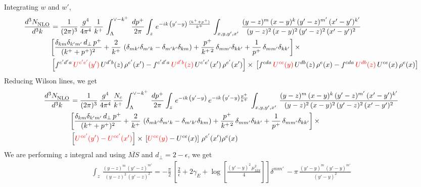 \documentclass[9pt]{article}
\numberwithin{equation}{section}
\begin{document}
Integrating $w$ and $w'$,
\begin{align}
     \frac{d^{3}N_{\rm NLO}^{\rm}}{d^{3}k}  & = \frac{1}{(2\pi)^{3}}\,\frac{g^{4}}{4\pi^{4}}\,\frac{1}{k^{+}}\,\int_{\Lambda}^{\vee-k^{+}}\, \frac{dp^{+}}{2\pi}\int_{z}\,e^{-ik\,\left(y'-y\right)\, \frac{(k^{+}+p^{+})}{k^{+}}}\,\int_{x,y,y^{\prime},x'}\,\frac{(y-z)^{m}\,(x-y)^{k}\,(y'-z)^{m'}\,(x'-y')^{k'}}{(y-z)^{2}\,(x-y)^{2}\,(y'-z)^{2}\,(x'-y')^{2}}\notag \\ &  \bigg[\frac{\delta_{km}\delta_{k'm'}\,d_{\perp}\,p^{+}}{(k^{+}+p^{+})^{2}}+\frac{2}{k^{+}}\,\left(\delta_{mk'}\delta_{m'k}-\delta_{m'k'}\delta_{km}\right) + \frac{p^{+}}{k^{+\,2}}\,\delta_{mm'}\delta_{kk'}+\frac{1}{p^{+}}\,\delta_{mm'}\delta_{kk'}\bigg]\,\times\,\notag \\ & \left[f^{c'd'a}\,{\color{red}U^{c'e'}(y')}\,U^{d'b}(z)\,\rho^{e'}(x')-f^{c'd'a}\, 
    {\color{red}U^{d'b}(z)}\,U^{c'e'}(x')\,\rho^{e'}(x')\right]\times\, \left[f^{cda}\,{\color{red}U^{ce}(y)}\,U^{db}(z)\,\rho^{e}(x)-f^{cda}\, 
    {\color{red}U^{db}(z)}\,U^{ce}(x)\,\rho^{e}(x)\right]
\end{align}
Reducing Wilson lines, we get
\begin{align}
     \frac{d^{3}N_{\rm NLO}^{\rm}}{d^{3}k}  & = \frac{1}{(2\pi)^{3}}\,\frac{g^{4}}{4\pi^{4}}\,\frac{N_{c}}{k^{+}}\,\int_{\Lambda}^{\vee-k^{+}}\, \frac{dp^{+}}{2\pi}\int_{z}\,e^{-ik\,\left(y'-y\right)}\,e^{-ik\,\left(y'-y\right)\frac{p^{+}}{k^{+}}}\,\int_{x,y,y^{\prime},x'}\,\frac{(y-z)^{m}\,(x-y)^{k}\,(y'-z)^{m'}\,(x'-y')^{k'}}{(y-z)^{2}\,(x-y)^{2}\,(y'-z)^{2}\,(x'-y')^{2}}\notag \\ &  \bigg[\frac{\delta_{km}\delta_{k'm'}\,d_{\perp}\,p^{+}}{(k^{+}+p^{+})^{2}}+\frac{2}{k^{+}}\,\left(\delta_{mk'}\delta_{m'k}-\delta_{m'k'}\delta_{km}\right) + \frac{p^{+}}{k^{+\,2}}\,\delta_{mm'}\delta_{kk'}+\frac{1}{p^{+}}\,\delta_{mm'}\delta_{kk'}\bigg]\,\times\,\notag \\ & \left[{\color{red}U^{ce'}(y') - U^{ce'}(x')}\right] \times\, \left[{\color{red}U^{ce}(y)} - U^{ce}(x)\right]\, \rho^{e'}(x') \rho^{e}(x)
\end{align}
We are performing $z$ integral and using $\overline{MS}$ and $d_{\perp} = 2-\epsilon$, we get
\begin{align}
    \int_{z}\, \frac{(y-z)^{m}\,(y'-z)^{m'}}{(y-z)^{2}\,(y'-z)^{2}} = -\frac{\pi}{2}\, \left[\frac{2}{\epsilon} +2\gamma_{E} + \log{\left[\frac{(y'-y)^{2}\,\mu^{2}_{\overline{MS}}}{4}\right]}\right]\delta^{mm'}\, - \pi\, \frac{(y'-y)^{m}\,(y'-y)^{m'}}{(y'-y)^{2}}
\end{align}
\end{document}
